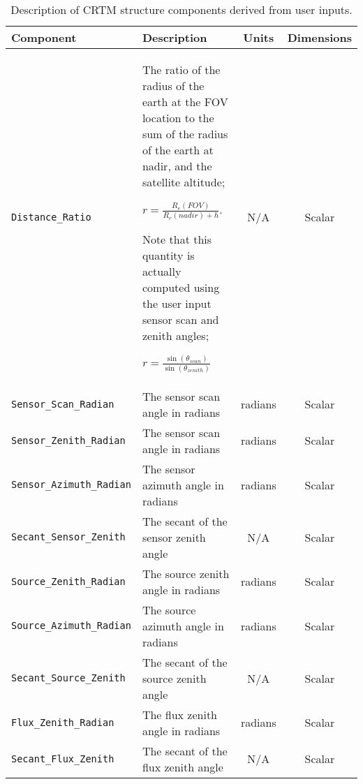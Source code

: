 \begin{table}[htp]
  \centering
  \begin{tabular}{l p{7cm} c c}
    \hline
    \sffamily\textbf{Component} & \sffamily\textbf{Description} & \sffamily\textbf{Units} & \sffamily\textbf{Dimensions} \\
    \hline\hline
    \texttt{Distance\_Ratio}         & The ratio of the radius of the earth at the FOV location to the sum of the radius of the earth at nadir, and the satellite altitude;
    
     \mbox{\hspace{1cm}$r = \displaystyle\frac{R_e(FOV)}{R_e(nadir) + h}$}.
     
     Note that this quantity is actually computed using the user input sensor scan and zenith angles; 
     
     \mbox{\hspace{1cm}$r = \displaystyle\frac{\sin(\theta_{scan})}{\sin(\theta_{zenith})}$} & N/A & Scalar \\
    \texttt{Sensor\_Scan\_Radian}    & The sensor scan angle in radians & radians & Scalar \\
    \texttt{Sensor\_Zenith\_Radian}  & The sensor scan angle in radians & radians & Scalar \\
    \texttt{Sensor\_Azimuth\_Radian} & The sensor azimuth angle in radians & radians & Scalar \\
    \texttt{Secant\_Sensor\_Zenith}  & The secant of the sensor zenith angle & N/A & Scalar \\
    \texttt{Source\_Zenith\_Radian}  & The source zenith angle in radians & radians & Scalar \\
    \texttt{Source\_Azimuth\_Radian} & The source azimuth angle in radians & radians & Scalar \\
    \texttt{Secant\_Source\_Zenith}  & The secant of the source zenith angle & N/A & Scalar \\
    \texttt{Flux\_Zenith\_Radian}    & The flux zenith angle in radians & radians & Scalar \\
    \texttt{Secant\_Flux\_Zenith}    & The secant of the flux zenith angle & N/A & Scalar \\
    \hline
  \end{tabular}
  \caption{Description of CRTM \GeometryInfo{} structure components derived from user inputs.}
  \label{tab:derived_geometryinfo_structure}
\end{table}

\clearpage




